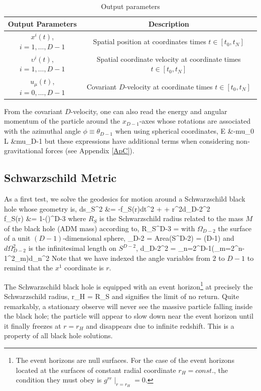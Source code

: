 \begin{table}[H]
	\centering
	\begin{tabular}{|c|c|}
		\hline
		Output Parameters & Description \\
		\hline
		\hline
		$x^{i}(t)$, $i=1,\dots,D-1$ & Spatial position at coordinates times $t\in[t_{0},t_{N}]$ \\
		\hline
		$\upsilon^{i}(t)$, $i=1,\dots,D-1$ & Spatial coordinate velocity at coordinate times $t\in[t_{0},t_{N}]$\\
		\hline
		$u_{\mu}(t)$, $i=0,\dots,D-1$ & Covariant $D$-velocity at coordinate times $t\in[t_{0},t_{N}]$\\
		\hline
	\end{tabular}
	\caption{Output parameters}
	\label{tbl:OUTPUT}
\end{table}

From the covariant $D$-velocity, one can also read the energy and angular momentum of the particle around the $x_{D-1}$-axes whose rotations are associated with the azimuthal angle $\phi \equiv \theta_{D-1}$ when using spherical coordinates,
\be\ba
	E &\equiv -mu_{0} \\
	L &\equiv mu_{D-1}
\ea\ee
but these expressions have additional terms when considering non-gravitational forces (see Appendix \ref{ApC}).

\subsection{Schwarzschild Metric}
As a first test, we solve the geodesics for motion around a Schwarzschild black hole whose geometry is,
\be\ba
	ds_{S}^2 &= -f_{S}(r)dt^2 +  + r^2d\Omega_{D-2}^2 \\
	f_{S}(r) &= 1-\left(\right)^{D-3}
\ea\ee
where $R_{S}$ is the Schwarzschild radius related to the mass $M$ of the black hole (ADM mass) according to,
\be
	R_{S}^{D-3} = 
\ee
with $\Omega_{D-2}$ the surface of a unit $(D-1)$-dimensional sphere,
\be
	\Omega_{D-2} = Area(S^{D-2}) = (D-1)
\ee
and $d\Omega_{D-2}^2$ is the infinitesimal length on $S^{D-2}$,
\be
	d\Omega_{D-2}^{2} = \sum_{n=2}^{D-1}\left(\prod_{m=2}^{n-1}\sin^2\theta_{m}\right)d\theta_{n}^2
\ee
Note that we have indexed the angle variables from $2$ to $D-1$ to remind that the $x^1$ coordinate is $r$.

The Schwarzschild black hole is equipped with an event horizon\footnote{The event horizons are null surfaces. For the case of the event horizons located at the surfaces of constant radial coordinate $r_{H} = const.$, the condition they must obey is $g^{rr}\mid_{r=r_{H}}=0$.} at precisely the Schwarzschild radius,
\be
	r_{H} = R_{S}
\ee
and signifies the limit of no return. Quite remarkably, a stationary observe will never see the massive particle falling inside the black hole; the particle will appear to slow down near the event horizon until it finally freezes at $r=r_{H}$ and disappears due to infinite redshift. This is a property of all black hole solutions.

